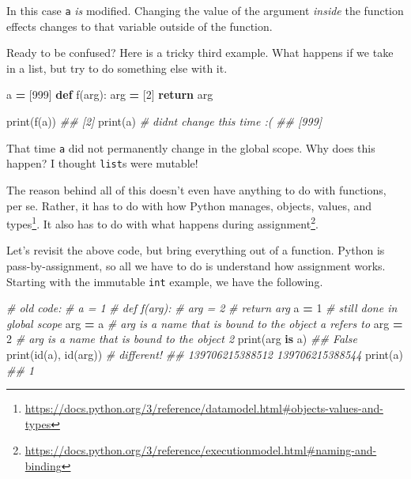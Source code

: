 \documentclass[
  12pt,
  krantz2]{krantz}
\makeatletter
\newenvironment{Shaded}{\begin{snugshade}}{\end{snugshade}}
\newcommand{\BuiltInTok}[1]{#1}
\newcommand{\CommentTok}[1]{\textcolor[rgb]{0.37,0.37,0.37}{\textit{#1}}}
\newcommand{\ControlFlowTok}[1]{\textcolor[rgb]{0.27,0.27,0.27}{\textbf{#1}}}
\newcommand{\DecValTok}[1]{\textcolor[rgb]{0.06,0.06,0.06}{#1}}
\newcommand{\KeywordTok}[1]{\textcolor[rgb]{0.27,0.27,0.27}{\textbf{#1}}}
\newcommand{\NormalTok}[1]{#1}
\newcommand{\OperatorTok}[1]{\textcolor[rgb]{0.43,0.43,0.43}{\textbf{#1}}}
\renewcommand{\href}[2]{#2\footnote{\url{#1}}}
\newenvironment{kframe}{%
\medskip{}
\setlength{\fboxsep}{.8em}
 \def\at@end@of@kframe{}%
 \ifinner\ifhmode%
  \def\at@end@of@kframe{\end{minipage}}%
  \begin{minipage}{\columnwidth}%
 \fi\fi%
 \def\FrameCommand##1{\hskip\@totalleftmargin \hskip-\fboxsep
 \colorbox{shadecolor}{##1}\hskip-\fboxsep
     \hskip-\linewidth \hskip-\@totalleftmargin \hskip\columnwidth}%
 \MakeFramed {\advance\hsize-\width
   \@totalleftmargin\z@ \linewidth\hsize
   \@setminipage}}%
 {\par\unskip\endMakeFramed%
 \at@end@of@kframe}
\renewenvironment{Shaded}{\begin{kframe}}{\end{kframe}}
\makeatother
\begin{document}
In this case \texttt{a} \emph{is} modified. Changing the value of the argument \emph{inside} the function effects changes to that variable outside of the function.

Ready to be confused? Here is a tricky third example. What happens if we take in a list, but try to do something else with it.

\begin{Shaded}
\begin{Highlighting}[]
\NormalTok{a }\OperatorTok{=}\NormalTok{ [}\DecValTok{999}\NormalTok{]}
\KeywordTok{def}\NormalTok{ f(arg):}
\NormalTok{  arg }\OperatorTok{=}\NormalTok{ [}\DecValTok{2}\NormalTok{]}
  \ControlFlowTok{return}\NormalTok{ arg}

\BuiltInTok{print}\NormalTok{(f(a))}
\CommentTok{\#\# [2]}
\BuiltInTok{print}\NormalTok{(a) }\CommentTok{\# didn\textquotesingle{}t change this time :(}
\CommentTok{\#\# [999]}
\end{Highlighting}
\end{Shaded}

That time \texttt{a} did not permanently change in the global scope. Why does this happen? I thought \texttt{list}s were mutable!

The reason behind all of this doesn't even have anything to do with functions, per se. Rather, it has to do with how Python manages, \href{https://docs.python.org/3/reference/datamodel.html\#objects-values-and-types}{objects, values, and types}. It also has to do with what happens during \href{https://docs.python.org/3/reference/executionmodel.html\#naming-and-binding}{assignment}.

Let's revisit the above code, but bring everything out of a function. Python is pass-by-assignment, so all we have to do is understand how assignment works. Starting with the immutable \texttt{int} example, we have the following.

\begin{Shaded}
\begin{Highlighting}[]
\CommentTok{\# old code: }
\CommentTok{\# a = 1}
\CommentTok{\# def f(arg):}
\CommentTok{\#   arg = 2}
\CommentTok{\#   return arg}
\NormalTok{a }\OperatorTok{=} \DecValTok{1}    \CommentTok{\# still done in global scope}
\NormalTok{arg }\OperatorTok{=}\NormalTok{ a  }\CommentTok{\# arg is a name that is bound to the object a refers to}
\NormalTok{arg }\OperatorTok{=} \DecValTok{2}  \CommentTok{\# arg is a name that is bound to the object 2}
\BuiltInTok{print}\NormalTok{(arg }\KeywordTok{is}\NormalTok{ a)}
\CommentTok{\#\# False}
\BuiltInTok{print}\NormalTok{(}\BuiltInTok{id}\NormalTok{(a), }\BuiltInTok{id}\NormalTok{(arg)) }\CommentTok{\# different!\textasciigrave{}}
\CommentTok{\#\# 139706215388512 139706215388544}
\BuiltInTok{print}\NormalTok{(a)}
\CommentTok{\#\# 1}
\end{Highlighting}
\end{Shaded}
\end{document}

